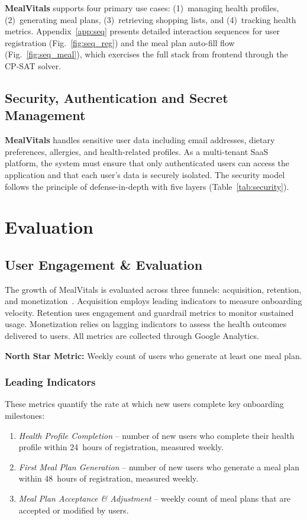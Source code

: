 \documentclass[conference]{IEEEtran}
\begin{document}
\textbf{MealVitals} supports four primary use cases: (1)~managing health profiles, (2)~generating meal plans, (3)~retrieving shopping lists, and (4)~tracking health metrics. Appendix~\ref{app:seq} presents detailed interaction sequences for user registration (Fig.~\ref{fig:seq_reg}) and the meal plan auto-fill flow (Fig.~\ref{fig:seq_meal}), which exercises the full stack from frontend through the CP-SAT solver.

\subsection{Security, Authentication and Secret Management}

\textbf{MealVitals} handles sensitive user data including email addresses, dietary preferences, allergies, and health-related profiles. As a multi-tenant SaaS platform, the system must ensure that only authenticated users can access the application and that each user's data is securely isolated. The security model follows the principle of defense-in-depth with five layers (Table~\ref{tab:security}).

\section{Evaluation}

\subsection{User Engagement \& Evaluation}

The growth of MealVitals is evaluated across three funnels: acquisition, retention, and monetization~\cite{b8}. Acquisition employs leading indicators to measure onboarding velocity. Retention uses engagement and guardrail metrics to monitor sustained usage. Monetization relies on lagging indicators to assess the health outcomes delivered to users. All metrics are collected through Google Analytics.

\textbf{North Star Metric:} Weekly count of users who generate at least one meal plan.

\subsubsection{Leading Indicators}
These metrics quantify the rate at which new users complete key onboarding milestones:
\begin{enumerate}
    \item \textit{Health Profile Completion} -- number of new users who complete their health profile within 24~hours of registration, measured weekly.
    \item \textit{First Meal Plan Generation} -- number of new users who generate a meal plan within 48~hours of registration, measured weekly.
    \item \textit{Meal Plan Acceptance \& Adjustment} -- weekly count of meal plans that are accepted or modified by users.
\end{enumerate}
\end{document}
